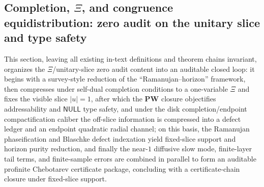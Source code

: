 \subsection{Completion, \texorpdfstring{$\Xi$}{Xi}, and congruence equidistribution: zero audit on the unitary slice and type safety}\label{subsec:xi-completion-audit}
This section, leaving all existing in-text definitions and theorem chains invariant, organizes the \(\Xi\)/unitary-slice zero audit content into an auditable closed loop: it begins with a survey-style reduction of the ``Ramanujan--horizon'' framework, then compresses under self-dual completion conditions to a one-variable \(\Xi\) and fixes the visible slice \(|u|=1\), after which the \(\mathbf{PW}\) closure objectifies addressability and \(\mathsf{NULL}\) type safety, and under the disk completion/endpoint compactification caliber the off-slice information is compressed into a defect ledger and an endpoint quadratic radial channel; on this basis, the Ramanujan phaseification and Blaschke defect indexation yield fixed-slice support and horizon purity reduction, and finally the near-\(1\) diffusive slow mode, finite-layer tail terms, and finite-sample errors are combined in parallel to form an auditable profinite Chebotarev certificate package, concluding with a certificate-chain closure under fixed-slice support.



















